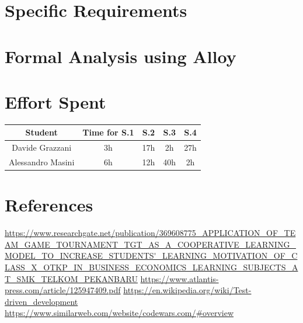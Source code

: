 \documentclass[table, 12pt]{article}
\begin{document}
    \section{Specific Requirements}
        
        \newpage
    
    \section{Formal Analysis using Alloy}
        
        \newpage
   
    \section{Effort Spent}
        \begin{table}[H]
            \centering
            \begin{tabular}{| c | c | c| c| c |}
                \hline
                Student & Time for S.1 & S.2 & S.3 & S.4 \\ \hline
                Davide Grazzani & 3h & 17h & 2h & 27h \\
                Alessandro Masini & 6h & 12h & 40h & 2h \\
                \hline
            \end{tabular}
        \end{table}
    \section{References}

    \begin{thebibliography}{9}
            \url{https://www.researchgate.net/publication/369608775_APPLICATION_OF_TEAM_GAME_TOURNAMENT_TGT_AS_A_COOPERATIVE_LEARNING_MODEL_TO_INCREASE_STUDENTS'_LEARNING_MOTIVATION_OF_CLASS_X_OTKP_IN_BUSINESS_ECONOMICS_LEARNING_SUBJECTS_AT_SMK_TELKOM_PEKANBARU}
            \url{https://www.atlantis-press.com/article/125947409.pdf}
            \url{https://en.wikipedia.org/wiki/Test-driven_development}
            \url{https://www.similarweb.com/website/codewars.com/#overview}
    \end{thebibliography}
\end{document}
